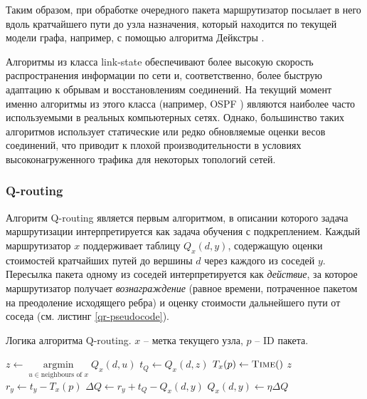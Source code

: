 \documentclass[specification,annotation,times]{itmo-student-thesis}
\DeclareMathOperator{\argmin}{argmin}
\theoremstyle{definition}
\begin{document}
Таким образом, при обработке очередного пакета маршрутизатор посылает в него
вдоль кратчайшего пути до узла назначения, который находится по текущей модели
графа, например, с помощью алгоритма Дейкстры \cite{dijkstra}. 

Алгоритмы из класса link-state обеспечивают более высокую скорость
распространения информации по сети и, соответственно, более быструю адаптацию
к обрывам и восстановлениям соединений. На текущий момент именно алгоритмы из
этого класса (например, OSPF \cite{ospf-rfc}) являются наиболее часто
используемыми в реальных компьютерных сетях. Однако, большинство таких
алгоритмов использует статические или редко обновляемые оценки весов соединений,
что приводит к плохой производительности в условиях высоконагруженного трафика
для некоторых топологий сетей.

\subsubsection{Q-routing}\label{q-routing-desc}

Алгоритм Q-routing \cite{q-routing-orig} является первым алгоритмом, в описании
которого задача маршрутизации интерпретируется как задача обучения с
подкреплением. Каждый маршрутизатор $x$ поддерживает таблицу $Q_x(d, y)$,
содержащую оценки стоимостей кратчайших путей до вершины $d$ через каждого из соседей
$y$. Пересылка пакета одному из соседей интерпретируется как \textit{действие},
за которое маршрутизатор получает \textit{вознаграждение} (равное времени,
потраченное пакетом на преодоление исходящего ребра) и оценку стоимости
дальнейшего пути от соседа (см. листинг \ref{qr-pseudocode}). 

\begin{algorithm}[!h]
\caption{Логика алгоритма Q-routing. $x$ -- метка текущего узла, $p$ -- ID пакета.}
\label{qr-pseudocode}
\begin{algorithmic}[1]
   
    \State $z \gets \argmin\limits_{u \in \text{neighbours of } x} Q_x(d, u)$
    \State $t_Q \gets Q_x(d, z)$
    \State $T_x(p) \gets \textsc{Time}()$ 
    \State {}
    \State \Return $z$ 
  \EndFunction
  \Statex
    \State $r_y \gets t_y - T_x(p)$
    \State $\Delta Q \gets r_y + t_Q - Q_x(d, y)$
    \State $Q_x(d, y) \gets \eta \Delta Q$ 
  \EndProcedure
\end{algorithmic}
\end{algorithm}
\end{document}
